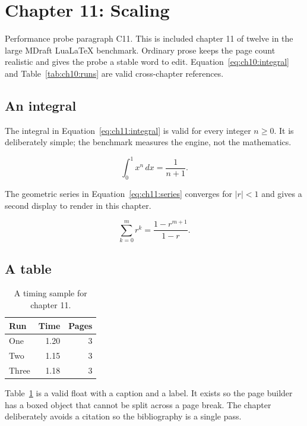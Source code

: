 \section{Chapter 11: Scaling}
\label{sec:ch11}

Performance probe paragraph C11. This is included chapter 11 of twelve in
the large MDraft LuaLaTeX benchmark. Ordinary prose keeps the page count
realistic and gives the probe a stable word to edit. Equation~\ref{eq:ch10:integral} and
Table~\ref{tab:ch10:runs} are valid cross-chapter references.

\subsection{An integral}
The integral in Equation~\ref{eq:ch11:integral} is valid for every integer
$n \ge 0$. It is deliberately simple; the benchmark measures the engine, not
the mathematics.

\begin{equation}
  \label{eq:ch11:integral}
  \int_{0}^{1} x^{n}\,dx = \frac{1}{n+1}.
\end{equation}

The geometric series in Equation~\ref{eq:ch11:series} converges for
$|r| < 1$ and gives a second display to render in this chapter.

\begin{equation}
  \label{eq:ch11:series}
  \sum_{k=0}^{m} r^{k} = \frac{1-r^{m+1}}{1-r}.
\end{equation}

\subsection{A table}
\begin{table}[h]
  \centering
  \begin{tabular}{lrr}
    \toprule
    Run & Time & Pages \\
    \midrule
    One   & 1.20 & 3 \\
    Two   & 1.15 & 3 \\
    Three & 1.18 & 3 \\
    \bottomrule
  \end{tabular}
  \caption{A timing sample for chapter 11.}
  \label{tab:ch11:runs}
\end{table}

Table~\ref{tab:ch11:runs} is a valid float with a caption and a label. It
exists so the page builder has a boxed object that cannot be split across a
page break. The chapter deliberately avoids a citation so the bibliography is a single pass.

